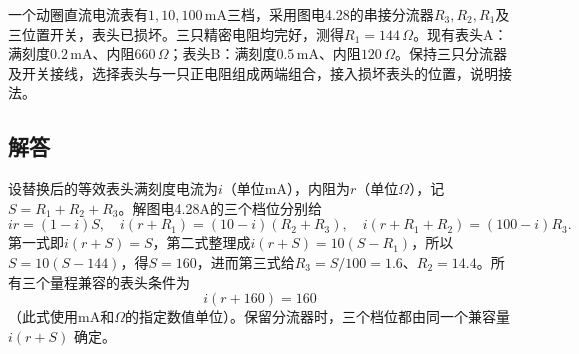 \documentclass[UTF8,fontset=fandol,a4paper,11pt]{ctexart}
\newcommand{\figcaption}[1]{\par\vspace{2pt}{\small\color{muted}#1}\par}
\begin{document}
一个动圈直流电流表有$1,10,100\,\mathrm{mA}$三档，采用图电4.28的串接分流器$R_3,R_2,R_1$及三位置开关，表头已损坏。三只精密电阻均完好，测得$R_1=144\,\Omega$。现有表头A：满刻度$0.2\,\mathrm{mA}$、内阻$660\,\Omega$；表头B：满刻度$0.5\,\mathrm{mA}$、内阻$120\,\Omega$。保持三只分流器及开关接线，选择表头与一只正电阻组成两端组合，接入损坏表头的位置，说明接法。

\begin{center}\begin{minipage}{.98\linewidth}\centering
{}
\figcaption{图电4.28\quad 串接分流器及三档选择接点}
\end{minipage}\end{center}

\subsection*{解答}

设替换后的等效表头满刻度电流为$i$（单位mA），内阻为$r$（单位$\Omega$），记$S=R_1+R_2+R_3$。解图电4.28A的三个档位分别给
\[
ir=(1-i)S,\quad i(r+R_1)=(10-i)(R_2+R_3),\quad
i(r+R_1+R_2)=(100-i)R_3.
\]
第一式即$i(r+S)=S$，第二式整理成$i(r+S)=10(S-R_1)$，所以$S=10(S-144)$，得$S=160$，进而第三式给$R_3=S/100=1.6$、$R_2=14.4$。所有三个量程兼容的表头条件为
\[
\boxed{i(r+160)=160}
\]
（此式使用mA和$\Omega$的指定数值单位）。保留分流器时，三个档位都由同一个兼容量 $i(r+S)$ 确定。
\end{document}
